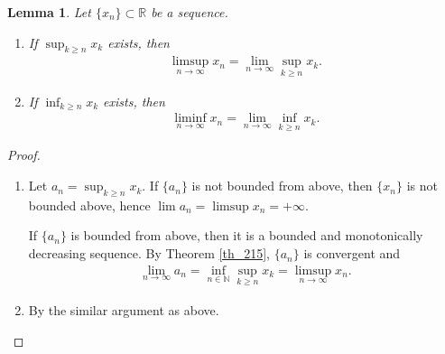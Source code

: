 \documentclass[10pt]{book}
\newtheorem{lemma}{Lemma}[chapter]
\theoremstyle{definition}
\numberwithin{equation}{chapter}
\begin{document}
\begin{lemma}
Let $\{x_n\} \subset \mathbb{R}$ be a sequence.
\begin{enumerate}[label=(\alph*)]
    \item If $\sup_{k \geq n} x_k$ exists, then
    \begin{align*}
        \limsup_{n\to\infty} x_n = \lim_{n\to\infty} \sup_{k \geq n} x_k.
    \end{align*}
    
    \item If $\inf_{k \geq n} x_k$ exists, then
    \begin{align*}
        \liminf_{n\to\infty} x_n = \lim_{n\to\infty} \inf_{k \geq n} x_k.
    \end{align*}
\end{enumerate}
\end{lemma}
\begin{proof}
~\begin{enumerate}[label=(\alph*)]
    \item Let $a_n = \sup_{k\geq n}x_k$. If $\{a_n\}$ is not bounded from above, then $\{x_n\}$ is not bounded above, hence $\lim a_n = \limsup x_n = + \infty$. 
    
    If $\{a_n\}$ is bounded from above, then it is a bounded and monotonically decreasing sequence. By Theorem \ref{th_215}, $\{a_n\}$ is convergent and
    \begin{align*}
        \lim_{n\to\infty} a_n = \inf_{n \in \mathbb{N}} \sup_{k \geq n} x_k = \limsup_{n\to\infty} x_n.
    \end{align*}
    
    \item By the similar argument as above.
\end{enumerate}
\end{proof}

\medskip
\end{document}
